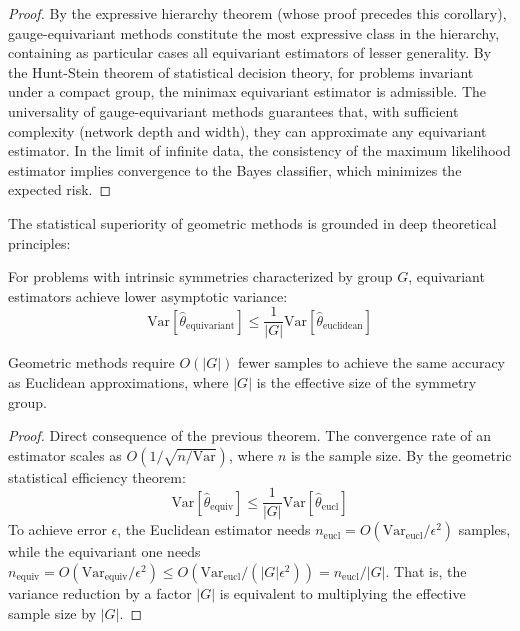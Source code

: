 \begin{proof}
By the expressive hierarchy theorem (whose proof precedes this corollary), gauge-equivariant methods constitute the most expressive class in the hierarchy, containing as particular cases all equivariant estimators of lesser generality. By the Hunt-Stein theorem of statistical decision theory, for problems invariant under a compact group, the minimax equivariant estimator is admissible. The universality of gauge-equivariant methods guarantees that, with sufficient complexity (network depth and width), they can approximate any equivariant estimator. In the limit of infinite data, the consistency of the maximum likelihood estimator implies convergence to the Bayes classifier, which minimizes the expected risk.
\end{proof}

The statistical superiority of geometric methods is grounded in deep theoretical principles:

\begin{theorem}
For problems with intrinsic symmetries characterized by group $G$, equivariant estimators achieve lower asymptotic variance:
\begin{equation}
\text{Var}[\hat{\theta}_{\text{equivariant}}] \leq \frac{1}{|G|} \text{Var}[\hat{\theta}_{\text{euclidean}}]
\end{equation}
\end{theorem}

\begin{corollary}
Geometric methods require $O(|G|)$ fewer samples to achieve the same accuracy as Euclidean approximations, where $|G|$ is the effective size of the symmetry group.
\end{corollary}

\begin{proof}
Direct consequence of the previous theorem. The convergence rate of an estimator scales as $O(1/\sqrt{n/\text{Var}})$, where $n$ is the sample size. By the geometric statistical efficiency theorem:
\[
\text{Var}[\hat{\theta}_{\text{equiv}}] \leq \frac{1}{|G|}\text{Var}[\hat{\theta}_{\text{eucl}}]
\]
To achieve error $\epsilon$, the Euclidean estimator needs $n_{\text{eucl}} = O(\text{Var}_{\text{eucl}}/\epsilon^2)$ samples, while the equivariant one needs $n_{\text{equiv}} = O(\text{Var}_{\text{equiv}}/\epsilon^2) \leq O(\text{Var}_{\text{eucl}}/(|G|\epsilon^2)) = n_{\text{eucl}}/|G|$. That is, the variance reduction by a factor $|G|$ is equivalent to multiplying the effective sample size by $|G|$.
\end{proof}

